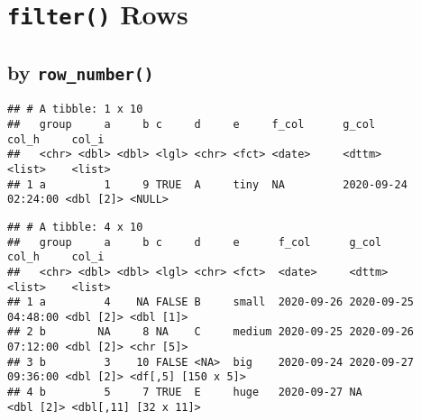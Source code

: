 \documentclass[
]{book}
\newenvironment{Shaded}{\begin{snugshade}}{\end{snugshade}}
\newcommand{\DecValTok}[1]{\textcolor[rgb]{0.00,0.00,0.81}{#1}}
\newcommand{\KeywordTok}[1]{\textcolor[rgb]{0.13,0.29,0.53}{\textbf{#1}}}
\newcommand{\NormalTok}[1]{#1}
\newcommand{\OperatorTok}[1]{\textcolor[rgb]{0.81,0.36,0.00}{\textbf{#1}}}
\newcommand{\StringTok}[1]{\textcolor[rgb]{0.31,0.60,0.02}{#1}}
\begin{document}
\hypertarget{filter-rows}{%
\section{\texorpdfstring{\texttt{filter()} Rows}{filter() Rows}}\label{filter-rows}}

\hypertarget{by-row_number}{%
\subsection{\texorpdfstring{by \texttt{row\_number()}}{by row\_number()}}\label{by-row_number}}

\begin{Shaded}
\end{Shaded}

\begin{verbatim}
## # A tibble: 1 x 10
##   group     a     b c     d     e     f_col      g_col               col_h     col_i 
##   <chr> <dbl> <dbl> <lgl> <chr> <fct> <date>     <dttm>              <list>    <list>
## 1 a         1     9 TRUE  A     tiny  NA         2020-09-24 02:24:00 <dbl [2]> <NULL>
\end{verbatim}

\begin{Shaded}
\end{Shaded}

\begin{verbatim}
## # A tibble: 4 x 10
##   group     a     b c     d     e      f_col      g_col               col_h     col_i               
##   <chr> <dbl> <dbl> <lgl> <chr> <fct>  <date>     <dttm>              <list>    <list>              
## 1 a         4    NA FALSE B     small  2020-09-26 2020-09-25 04:48:00 <dbl [2]> <dbl [1]>           
## 2 b        NA     8 NA    C     medium 2020-09-25 2020-09-26 07:12:00 <dbl [2]> <chr [5]>           
## 3 b         3    10 FALSE <NA>  big    2020-09-24 2020-09-27 09:36:00 <dbl [2]> <df[,5] [150 x 5]>  
## 4 b         5     7 TRUE  E     huge   2020-09-27 NA                  <dbl [2]> <dbl[,11] [32 x 11]>
\end{verbatim}
\end{document}
